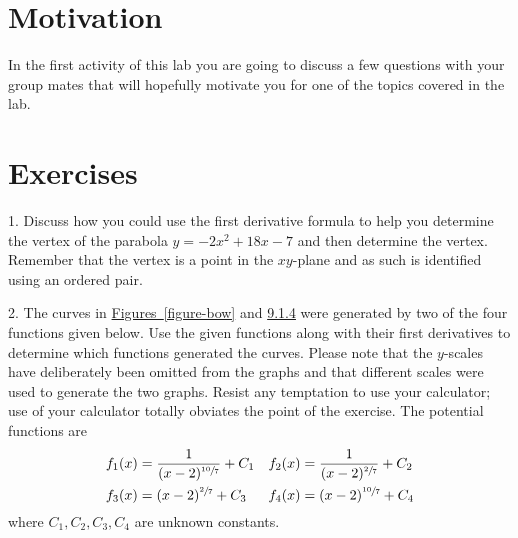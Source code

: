 \documentclass[12pt,]{book}
\theoremstyle{plain}
\theoremstyle{definition}
\numberwithin{equation}{section}
\newcounter{figstack}
\newlength\fight
\newcommand\pushValignCaptionBottom[5][b]{%
\stepcounter{figstack}%
\expandafter\def\csname %
figalign\romannumeral\value{figstack}\endcsname{#1}%
\expandafter\def\csname %
figtype\romannumeral\value{figstack}\endcsname{#2}%
\expandafter\def\csname %
figwd\romannumeral\value{figstack}\endcsname{#3}%
\expandafter\def\csname %
figcontent\romannumeral\value{figstack}\endcsname{#4}%
\expandafter\def\csname %
figcap\romannumeral\value{figstack}\endcsname{#5}%
\setbox0=\hbox{%
\begin{#2}{#3}#4\end{#2}}%
\ifdim\dimexpr\ht0+\dp0\relax>\fight\global\setlength{\fight}{%
\dimexpr\ht0+\dp0\relax}\fi%
}
\providecommand\phantomsection{}
\newcommand{\fe}[2]{\mathop{{#1}{\left(#2\right)}}}
\begin{document}
\section[Motivation]{Motivation}\label{section-motivation-for-critical-numbers}
In the first activity of this lab you are going to discuss a few questions with your group mates that will hopefully motivate you for one of the topics covered in the lab.%
\typeout{************************************************}
\typeout{************************************************}
\section*{Exercises}\label{exercises-46}

\begin{exerciselist}
\item[1.]\phantomsection\hypertarget{exercise-parabola-vertex}{\null}Discuss how you could use the first derivative formula to help you determine the vertex of the parabola \(y=-2x^2+18x-7\) and then determine the vertex.  Remember that the vertex is a point in the \(xy\)-plane and as such is identified using an ordered pair.%
\par\smallskip
\item[2.]\phantomsection\hypertarget{exercise-distinguish-graphs-by-critical-nature}{\null}The curves in \hyperref[figure-bow]{Figures~\ref*{figure-bow}} and \hyperref[figure-pointy]{9.1.4} were generated by two of the four functions given below.  Use the given functions along with their first derivatives to determine which functions generated the curves.  Please note that the \(y\)-scales have deliberately been omitted from the graphs and that different scales were used to generate the two graphs.  Resist any temptation to use your calculator; use of your calculator totally obviates the point of the exercise. The potential functions are \begin{align*}
\fe{f_1}{x}&=\frac{1}{(x-2)^{\sfrac{10}{7}}}+C_1&\fe{f_2}{x}&=\frac{1}{(x-2)^{\sfrac{2}{7}}}+C_2\\
\fe{f_3}{x}&=(x-2)^{\sfrac{2}{7}}+C_3&\fe{f_4}{x}&=(x-2)^{\sfrac{10}{7}}+C_4
\end{align*} where \(C_1,C_2,C_3,C_4\) are unknown constants.%
\end{exerciselist}
\end{document}

